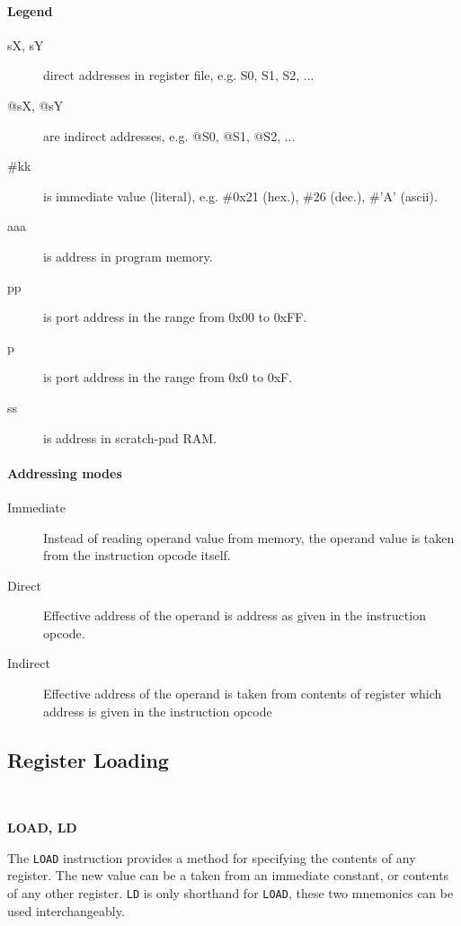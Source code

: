 \newcommand{\no}{\color{red}{\textbf{no}}}
\newcommand{\yes}{\color{black}{\textbf{yes}}}

\newcommand{\instruction}[1]{~\\[7pt]\addcontentsline{toc}{subsection}{#1}\colorbox{instruction_bg}{\parbox{\dimexpr\textwidth-2\fboxsep}{\color{black}\textbf{#1}}}\bigskip}

\paragraph{Legend}
    \begin{description}
        \item[sX, sY]
            direct addresses in register file, e.g. S0, S1, S2, ...
        \item[@sX, @sY]
            are indirect addresses, e.g. @S0, @S1, @S2, ...
        \item[\#kk]
            is immediate value (literal), e.g. \#0x21 (hex.), \#26 (dec.), \#'A' (ascii).
        \item[aaa]
            is address in program memory.
        \item[pp]
            is port address in the range from 0x00 to 0xFF.
        \item[p]
            is port address in the range from 0x0 to 0xF.
        \item[ss]
            is address in scratch-pad RAM.
    \end{description}

\paragraph{Addressing modes}
    \begin{description}
        \item[Immediate]
            Instead of reading operand value from memory, the operand value is taken from the instruction opcode itself.
        \item[Direct]
            Effective address of the operand is address as given in the instruction opcode.
        \item[Indirect]
            Effective address of the operand is taken from contents of register which address is given in the instruction opcode
    \end{description}

\subsection{Register Loading}
    \instruction{LOAD, LD}
        The \texttt{LOAD} instruction provides a method for specifying the contents of any register. The new value can be a taken from an immediate constant, or contents of any other register. \texttt{LD} is only shorthand for \texttt{LOAD}, these two mnemonics can be used interchangeably.

